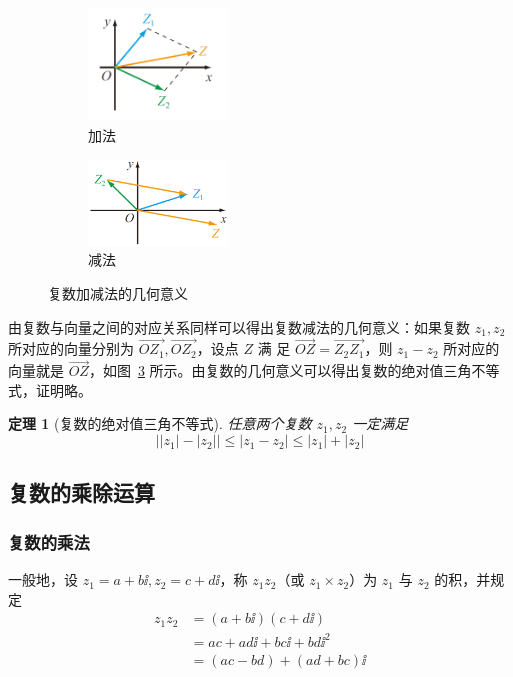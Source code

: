 \documentclass[a4paper,openany]{ctexbook}
\newtheorem{thmlevel1}{定理}[chapter]
\renewcommand{\vec}{\overrightarrow}
\begin{document}
\begin{figure}
    \centering
    \begin{subfigure}{10em}
        \includegraphics[width=10em]{image4.png}
        \caption{加法}\label{fgr:fuuujxfa}
    \end{subfigure}
    \qquad
    \begin{subfigure}{10em}
        \includegraphics[width=10em]{image5.png}
        \caption{减法}\label{fgr:fuuujmfa}
    \end{subfigure}
    \caption{复数加减法的几何意义}
\end{figure}

由复数与向量之间的对应关系同样可以得出复数减法的几何意义：如果复数 \(z_1,z_2\) 所对应的向量分别为 \(\vec{OZ_1},\vec{OZ_2}\)，设点 \(Z\) 满
足 \(\vec{OZ}=\vec{Z_2Z_1}\)，则 \(z_1-z_2\) 所对应的向量就是 \(\vec{OZ}\)，如图~\ref{fgr:fuuujmfa} 所示。由复数的几何意义可以得出复数的绝对值三角不等式，证明略。

\begin{thmlevel1}[复数的绝对值三角不等式]
    任意两个复数 \(z_1,z_2\) 一定满足
    \[
        \big||z_1|-|z_2|\big|\le |z_1-z_2| \le |z_1|+|z_2|
    \]
\end{thmlevel1}

\subsection{复数的乘除运算}

\subsubsection{复数的乘法}

一般地，设 \(z_1=a+b\ii,z_2=c+d\ii\)，称 \(z_1z_2\)（或 \(z_1\times z_2\)）为 \(z_1\) 与 \(z_2\) 的积，并规定
\begin{align*}
    z_1z_2 & = (a+b\ii)(c+d\ii)       \\
           & = ac+ad\ii+bc\ii+bd\ii^2 \\
           & =(ac-bd)+(ad+bc)\ii
\end{align*}
\end{document}

